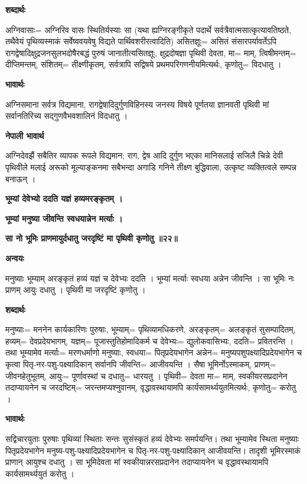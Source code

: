 \documentclass[11pt, a5paper]{article}
\begin{document}
\textbf{शब्दार्थः}

अग्निवासाः= अग्निरिव वासः स्थितिर्यस्याः सा (यथा ह्यग्निरङ्गीकृते पदार्थे सर्वत्रैवात्मसात्कृत्यावतिष्ठते, तथैवेयं पृथिव्यस्माकं सर्वेष्ववयवेषु विद्यते पार्थिवशरीरत्वादिति) असितज्ञूः= असितं संसारपर्यावर्तेऽपि रागद्वेषादिक्षुद्रजनसुलभदोषैरबद्धं पुरुषं जानातीत्यसितज्ञूः, क्षुद्रदोषज्ञा पृथिवी देवता, मा= माम्, त्विषीमन्तम्= दीप्तिमन्तम्, संशितम्= तीक्ष्णीकृतम्, सर्वत्रापि सद्विषये प्रथमपरिगणनीयमित्यर्थः, कृणोतु= विदधातु ।

\textbf{भावार्थः}

अग्निसमाना सर्वत्र विद्यमाना, रागद्वेषादिदुर्गुणविहिनस्य जनस्य विषये पूर्णतया ज्ञानवती पृथिवी मां सर्वानतिरिच्य सद्‍गुणवैभवशालिनं विदधातु ।

\textbf{नेपाली भावार्थ}

अग्निदेवझैं सबैतिर व्यापक रूपले विद्यमान; राग, द्वेष आदि दुर्गुण भएका मानिसलाई सजिलै चिन्ने देवी पृथिवीले मलाई अरूको मूल्याङ्कनमा सबैभन्दा अगाडि गनिने तीक्ष्ण बुद्धिवाला, उत्कृष्ट व्यक्तित्वले सम्पन्न बनाऊन् ।

\textbf{भूम्यां देवेभ्यो ददति यज्ञं हव्यमरङ्‍कृतम् ।}

\textbf{भूम्यां मनुष्या जीवन्ति स्वधयान्नेन मर्त्याः ।}

\textbf{सा नो भूमिः प्राणमायुर्दधातु जरदृष्टिं मा पृथिवी कृणोतु ॥२२॥}

\textbf{अन्वयः}

मनुष्याः भूम्याम् अरङ्‍कृतं हव्यं यज्ञं च देवेभ्यः ददति । भूम्यां मर्त्याः स्वधया अन्नेन जीवन्ति । सा भूमिः नः प्राणम् आयुः दधातु । पृथिवी मा जरदृष्टिं कृणोतु ।

\textbf{शब्दार्थः}

मनुष्याः= मननेन कार्यकारिणः पुरुषाः, भूम्याम्= पृथिव्यामधिकरणे, अरङ्‍कृतम्= अलङ्‍कृतं सुसम्पादितम्, हव्यम्= देवप्रदेयभागम्, यज्ञम्= पूजास्तुतिहोमादिकर्म च देवेभ्यः= द्युलोकवासिभ्यः, ददति= प्रवितरन्ति । तथा भूम्यामेव मर्त्याः= मरणधर्माणो मनुष्याः, स्वधया= पितृप्रदेयभागेन अन्नेन= मनुष्यपशुपक्ष्यादिप्रदेयभागेन च कृत्वा पितृ-नर-पशु-पक्ष्यादिकान् सर्वानपि जीवन्ति= आजीवयन्ति । सैषा भूमिर्नोऽस्माकम्, प्राणम्= जीवनहेतुभूतम्, आयुः= पूर्णावस्थां च दधातु= धारयतु । पृथिवी= देवता मा= माम्, स्वकीयरसप्रदानेन तदाप्यायनेन च जरदष्टिम्= जरन्तमप्यश्नुवानम्, वृद्धावस्थायामपि कार्यसामर्थ्ययुतमित्यर्थः, कृणोतु= करोतु ।

\textbf{भावार्थः}

सद्विचारयुताः पुरुषाः पृथिव्यां स्थिताः सन्तः सुसंस्कृतं हव्यं देवेभ्यः समर्पयन्ति। तथा भूम्यामेव स्थिता मनुष्याः पितृप्रदेयभागेन मनुष्य-पशु-पक्ष्यादिप्रदेयभागेन च पितृ-नर-पशु-पक्ष्यादिकान् आजीवयन्ति। तादृशी भूमिरस्माकं प्राणान् आयुश्च दधातु । सा भूमिदेवता मां स्वकीयान्नरसप्रदानेन तदाप्यायनेन च वृद्धावस्थायामपि कार्यसामर्थ्ययुतं करोतु ।
\end{document}
